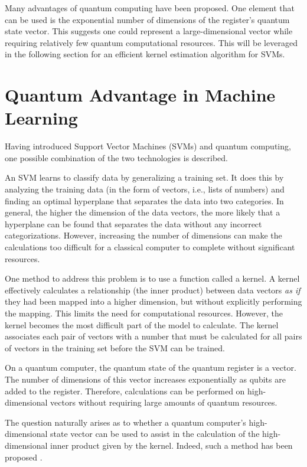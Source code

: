 \documentclass[%
 reprint,
nofootinbib,
 amsmath,amssymb,
 aps,
]{revtex4-2}
\begin{document}
Many advantages of quantum computing have been proposed. One element that can be used is the exponential number of dimensions of the register's quantum state vector. This suggests one could represent a large-dimensional vector while requiring relatively few quantum computational resources. This will be leveraged in the following section for an efficient kernel estimation algorithm for SVMs.

\section{Quantum Advantage in Machine Learning}
\label{sec:QML}

Having introduced Support Vector Machines (SVMs) and quantum computing, one possible combination of the two technologies is described.

An SVM learns to classify data by generalizing a training set. It does this by analyzing the training data (in the form of vectors, i.e., lists of numbers) and finding an optimal hyperplane that separates the data into two categories. In general, the higher the dimension of the data vectors, the more likely that a hyperplane can be found that separates the data without any incorrect categorizations. However, increasing the number of dimensions can make the calculations too difficult for a classical computer to complete without significant resources.

One method to address this problem is to use a function called a kernel. A kernel effectively calculates a relationship (the inner product) between data vectors \textit{as if} they had been mapped into a higher dimension, but without explicitly performing the mapping. This limits the need for computational resources. However, the kernel becomes the most difficult part of the model to calculate. The kernel associates each pair of vectors with a number that must be calculated for all pairs of vectors in the training set before the SVM can be trained.

On a quantum computer, the quantum state of the quantum register is a vector. The number of dimensions of this vector increases exponentially as qubits are added to the register. Therefore, calculations can be performed on high-dimensional vectors without requiring large amounts of quantum resources.

The question naturally arises as to whether a quantum computer's high-dimensional state vector can be used to assist in the calculation of the high-dimensional inner product given by the kernel. Indeed, such a method has been proposed \cite{russo_quantum_2023}.
\end{document}
